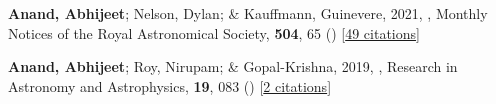 \item[{\color{numcolor}\scriptsize2}] \textbf{Anand, Abhijeet}; Nelson, Dylan; \& Kauffmann, Guinevere, 2021, , Monthly Notices of the Royal Astronomical Society, \textbf{504}, 65 () [\href{https://ui.adsabs.harvard.edu/abs/2021MNRAS.504...65A}{49 citations}]

\item[{\color{numcolor}\scriptsize1}] \textbf{Anand, Abhijeet}; Roy, Nirupam; \& Gopal-Krishna, 2019, , Research in Astronomy and Astrophysics, \textbf{19}, 083 () [\href{https://ui.adsabs.harvard.edu/abs/2019RAA....19...83A}{2 citations}]